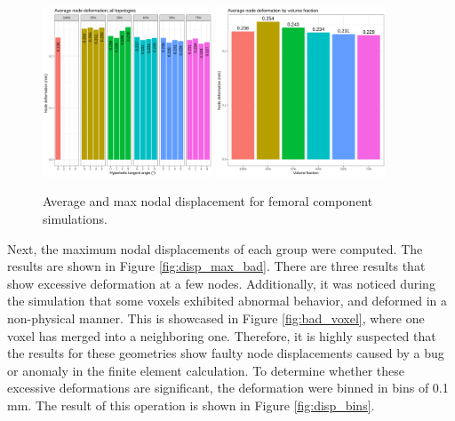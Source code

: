 \documentclass[../main.tex]{subfiles}
\begin{document}
\begin{figure}[h!]
  \includegraphics[width=0.45\textwidth]{images/results/plots/femoral/displacement/femoral_average.png}
  \hfill 
  \includegraphics[width=0.45\textwidth]{images/results/plots/femoral/displacement/femoral_average_group.png}
  \caption{Average and max nodal displacement for femoral component simulations.}
  \label{fig:disp_averages}
\end{figure}

Next, the maximum nodal displacements of each group were computed. The results are shown in Figure \ref{fig:disp_max_bad}. There are three results that show excessive deformation at a few nodes. Additionally, it was noticed during the simulation that some voxels exhibited abnormal behavior, and deformed in a non-physical manner. This is showcased in Figure \ref{fig:bad_voxel}, where one voxel has merged into a neighboring one. Therefore, it is highly suspected that the results for these geometries show faulty node displacements caused by a bug or anomaly in the finite element calculation. To determine whether these excessive deformations are significant, the deformation were binned in bins of 0.1 mm. The result of this operation is shown in  Figure \ref{fig:disp_bins}.
\end{document}
